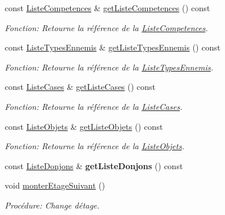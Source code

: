 \begin{DoxyCompactItemize}
const \mbox{\hyperlink{structListeCompetences}{Liste\+Competences}} \& \mbox{\hyperlink{classJeu_ac7917f690a8dd29b9af1278a907edbfb}{get\+Liste\+Competences}} () const
\begin{DoxyCompactList}\small\item\em Fonction\+: Retourne la référence de la \mbox{\hyperlink{structListeCompetences}{Liste\+Competences}}. \end{DoxyCompactList}\item 
const \mbox{\hyperlink{structListeTypesEnnemis}{Liste\+Types\+Ennemis}} \& \mbox{\hyperlink{classJeu_ab7033079ca4b29a4673da3a799626a0a}{get\+Liste\+Types\+Ennemis}} () const
\begin{DoxyCompactList}\small\item\em Fonction\+: Retourne la référence de la \mbox{\hyperlink{structListeTypesEnnemis}{Liste\+Types\+Ennemis}}. \end{DoxyCompactList}\item 
const \mbox{\hyperlink{structListeCases}{Liste\+Cases}} \& \mbox{\hyperlink{classJeu_a9682a359e29f9f60e73ea05c36712b46}{get\+Liste\+Cases}} () const
\begin{DoxyCompactList}\small\item\em Fonction\+: Retourne la référence de la \mbox{\hyperlink{structListeCases}{Liste\+Cases}}. \end{DoxyCompactList}\item 
const \mbox{\hyperlink{structListeObjets}{Liste\+Objets}} \& \mbox{\hyperlink{classJeu_a11834724f2c7851c06aa9896529b8aa2}{get\+Liste\+Objets}} () const
\begin{DoxyCompactList}\small\item\em Fonction\+: Retourne la référence de la \mbox{\hyperlink{structListeObjets}{Liste\+Objets}}. \end{DoxyCompactList}\item 
\mbox{\label{classJeu_a3ca77e8078c77eefc38040f90c0d5ad0}} 
const \mbox{\hyperlink{structListeDonjons}{Liste\+Donjons}} \& {\bfseries get\+Liste\+Donjons} () const
\item 
\mbox{\label{classJeu_a5f3c6467e26ab3de39bd036cfccdac0f}} 
void \mbox{\hyperlink{classJeu_a5f3c6467e26ab3de39bd036cfccdac0f}{monter\+Etage\+Suivant}} ()
\begin{DoxyCompactList}\small\item\em Procédure\+: Change d\textquotesingle{}étage. \end{DoxyCompactList}\item 

\end{DoxyCompactItemize}
